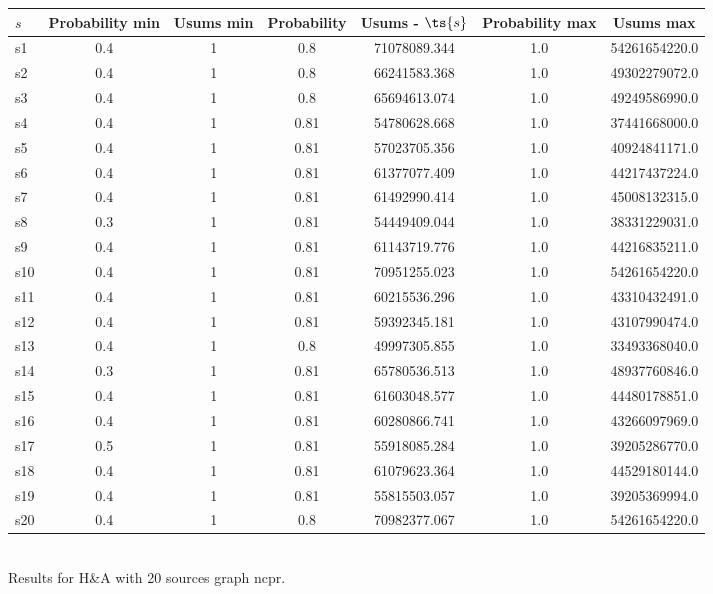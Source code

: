 \documentclass{article}
\begin{document}
\noindent\begin{tabular}{|l|c|c|c|c|c|c|}
\hline
$s$& Probability min & Usums min & Probability & Usums - $\ts{s}$ & Probability max & Usums max\\
\hline
s1 &0.4 & 1 & 0.8 & 71078089.344 & 1.0 & 54261654220.0\\
\hline
s2 &0.4 & 1 & 0.8 & 66241583.368 & 1.0 & 49302279072.0\\
\hline
s3 &0.4 & 1 & 0.8 & 65694613.074 & 1.0 & 49249586990.0\\
\hline
s4 &0.4 & 1 & 0.81 & 54780628.668 & 1.0 & 37441668000.0\\
\hline
s5 &0.4 & 1 & 0.81 & 57023705.356 & 1.0 & 40924841171.0\\
\hline
s6 &0.4 & 1 & 0.81 & 61377077.409 & 1.0 & 44217437224.0\\
\hline
s7 &0.4 & 1 & 0.81 & 61492990.414 & 1.0 & 45008132315.0\\
\hline
s8 &0.3 & 1 & 0.81 & 54449409.044 & 1.0 & 38331229031.0\\
\hline
s9 &0.4 & 1 & 0.81 & 61143719.776 & 1.0 & 44216835211.0\\
\hline
s10 &0.4 & 1 & 0.81 & 70951255.023 & 1.0 & 54261654220.0\\
\hline
s11 &0.4 & 1 & 0.81 & 60215536.296 & 1.0 & 43310432491.0\\
\hline
s12 &0.4 & 1 & 0.81 & 59392345.181 & 1.0 & 43107990474.0\\
\hline
s13 &0.4 & 1 & 0.8 & 49997305.855 & 1.0 & 33493368040.0\\
\hline
s14 &0.3 & 1 & 0.81 & 65780536.513 & 1.0 & 48937760846.0\\
\hline
s15 &0.4 & 1 & 0.81 & 61603048.577 & 1.0 & 44480178851.0\\
\hline
s16 &0.4 & 1 & 0.81 & 60280866.741 & 1.0 & 43266097969.0\\
\hline
s17 &0.5 & 1 & 0.81 & 55918085.284 & 1.0 & 39205286770.0\\
\hline
s18 &0.4 & 1 & 0.81 & 61079623.364 & 1.0 & 44529180144.0\\
\hline
s19 &0.4 & 1 & 0.81 & 55815503.057 & 1.0 & 39205369994.0\\
\hline
s20 &0.4 & 1 & 0.8 & 70982377.067 & 1.0 & 54261654220.0\\
\hline
\end{tabular}\\

\noindent Results for H\&A with 20 sources graph ncpr.
\end{document}
